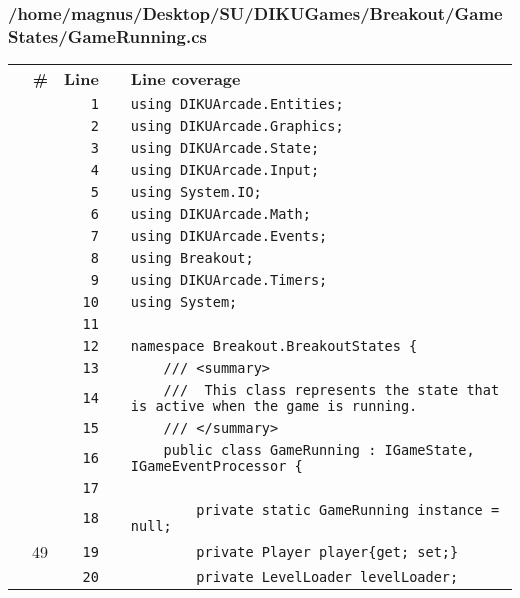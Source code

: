 \documentclass[a4paper,landscape,10pt]{article}
\begin{document}
\subsubsection{/home/magnus/Desktop/SU/DIKUGames/Breakout/GameStates/GameRunning.cs}
\begin{longtable}[l]{lrrll}
\textbf{} & \textbf{\#} & \textbf{Line} & \textbf{} & \textbf{Line coverage}\\
\cellcolor{gray} &  & \verb~1~ & & \verb~using DIKUArcade.Entities;~\\
\cellcolor{gray} &  & \verb~2~ & & \verb~using DIKUArcade.Graphics;~\\
\cellcolor{gray} &  & \verb~3~ & & \verb~using DIKUArcade.State;~\\
\cellcolor{gray} &  & \verb~4~ & & \verb~using DIKUArcade.Input;~\\
\cellcolor{gray} &  & \verb~5~ & & \verb~using System.IO;~\\
\cellcolor{gray} &  & \verb~6~ & & \verb~using DIKUArcade.Math;~\\
\cellcolor{gray} &  & \verb~7~ & & \verb~using DIKUArcade.Events;~\\
\cellcolor{gray} &  & \verb~8~ & & \verb~using Breakout;~\\
\cellcolor{gray} &  & \verb~9~ & & \verb~using DIKUArcade.Timers;~\\
\cellcolor{gray} &  & \verb~10~ & & \verb~using System;~\\
\cellcolor{gray} &  & \verb~11~ & & \verb~~\\
\cellcolor{gray} &  & \verb~12~ & & \verb~namespace Breakout.BreakoutStates {~\\
\cellcolor{gray} &  & \verb~13~ & & \verb~    /// <summary>~\\
\cellcolor{gray} &  & \verb~14~ & & \verb~    ///  This class represents the state that is active when the game is running.~\\
\cellcolor{gray} &  & \verb~15~ & & \verb~    /// </summary>~\\
\cellcolor{gray} &  & \verb~16~ & & \verb~    public class GameRunning : IGameState, IGameEventProcessor {~\\
\cellcolor{gray} &  & \verb~17~ & & \verb~~\\
\cellcolor{gray} &  & \verb~18~ & & \verb~        private static GameRunning instance = null;~\\
\cellcolor{green} & 49 & \verb~19~ & & \verb~        private Player player{get; set;}~\\
\cellcolor{gray} &  & \verb~20~ & & \verb~        private LevelLoader levelLoader;~\\

\end{longtable}
\end{document}
